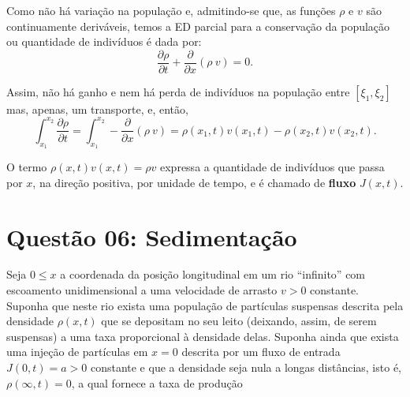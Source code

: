 Como não há variação na população e, admitindo-se que, as funções \(\rho\) e \(v\) são continuamente deriváveis, temos a ED parcial para a conservação da população ou quantidade de indivíduos é dada por:
\[\dfrac{\partial \rho}{\partial t} + \dfrac{\partial }{\partial x} (\rho\ v) = 0.\]


Assim, não há ganho e nem há perda de indivíduos na população entre \([\xi_1, \xi_2]\) mas, apenas, um transporte, e, então,
\[
\displaystyle\int_{x_1}^{x_2} \dfrac{\partial \rho}{\partial t} = 
\displaystyle\int_{x_1}^{x_2} - \dfrac{\partial }{\partial x} (\rho\ v) =
\rho(x_1,t) v(x_1,t) - \rho(x_2,t) v(x_2,t)
.\]

O termo \(\rho(x,t) v(x,t) = \rho v\) expressa a quantidade de indivíduos que passa por \(x\), na direção positiva, por unidade de tempo, e é chamado de \textbf{fluxo} \(J(x,t)\).






\clearpage
\chapter*{Questão 06: Sedimentação}

Seja $0 \le x$ a coordenada da posição longitudinal em um rio ``infinito'' com escoamento unidimensional a uma velocidade de arrasto $v > 0$ constante. Suponha que neste rio exista uma população de partículas suspensas descrita pela densidade $\rho(x,t)$ que se depositam no seu leito (deixando, assim, de serem suspensas) a uma taxa proporcional à densidade delas. Suponha ainda que exista uma injeção de partículas em $x = 0$ descrita por um fluxo de entrada $J(0,t) = a > 0$ constante e que a densidade seja nula a longas distâncias, isto é, $\rho(\infty, t) = 0$,
a qual fornece a taxa de produção

